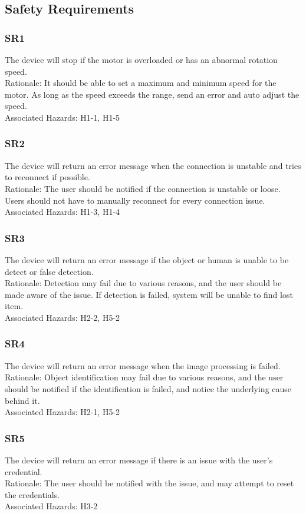 \documentclass{article}
\begin{document}
\subsection{Safety Requirements}
\subsubsection{SR1}
The device will stop if the motor is overloaded or has an abnormal rotation speed.\\
Rationale: It should be able to set a maximum and minimum speed for the motor. As long as the speed exceeds the range, send an error and auto adjust the speed.\\
Associated Hazards: H1-1, H1-5
\subsubsection{SR2}
The device will return an error message when the connection is unstable and tries to reconnect if possible.\\
Rationale: The user should be notified if the connection is unstable or loose. Users should not have to manually reconnect for every connection issue.\\
Associated Hazards: H1-3, H1-4
\subsubsection{SR3}
The device will return an error message if the object or human is unable to be detect or false detection.\\
Rationale: Detection may fail due to various reasons, and the user should be made aware of the issue. If detection is failed, system will be unable to find lost item.\\
Associated Hazards: H2-2, H5-2
\subsubsection{SR4}
The device will return an error message when the image processing is failed.\\
Rationale: Object identification may fail due to various reasons, and the user should be notified if the identification is failed, and notice the underlying cause behind it.\\
Associated Hazards: H2-1, H5-2
\subsubsection{SR5}
The device will return an error message if there is an issue with the user’s credential.\\
Rationale: The user should be notified with the issue, and may attempt to reset the credentials.\\
Associated Hazards: H3-2
\end{document}
